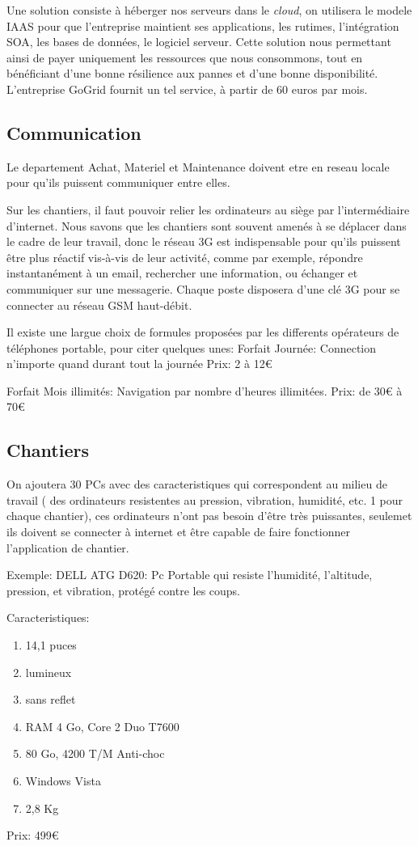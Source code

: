 \documentclass [a4paper] {report}
\begin{document}
Une solution consiste à héberger nos serveurs dans le \textsl{cloud}, on utilisera le modele IAAS pour  que l'entreprise maintient ses applications, les rutimes, l'intégration SOA, les bases de données, le logiciel serveur.
Cette solution nous permettant ainsi de payer uniquement les ressources que nous consommons, tout en bénéficiant d'une bonne résilience aux pannes et d'une bonne disponibilité.
L'entreprise GoGrid fournit un tel service, à partir de 60 euros par mois.


\subsection{Communication}
Le departement Achat, Materiel et Maintenance doivent etre en reseau locale pour qu'ils puissent  communiquer entre elles.

Sur les chantiers, il faut pouvoir relier les ordinateurs au siège par l’intermédiaire d’internet. Nous savons que les chantiers sont souvent amenés à se déplacer dans le cadre de leur travail, donc le réseau 3G est indispensable pour qu'ils puissent être plus réactif vis-à-vis de leur activité, comme par exemple, répondre instantanément à un email, rechercher une information, ou échanger et communiquer sur une messagerie. Chaque poste disposera d’une clé 3G pour se connecter au réseau GSM haut-débit.

Il existe une largue choix de formules proposées par les differents opérateurs de téléphones portable, pour citer quelques unes:
Forfait Journée: Connection n'importe quand durant tout la journée
Prix: 2 à 12€

Forfait Mois illimités: Navigation par nombre d'heures illimitées.
Prix: de 30€ à 70€


   

\subsection{Chantiers}
On ajoutera 30 PCs avec des caracteristiques qui correspondent au milieu de travail ( des ordinateurs resistentes au pression, vibration, humidité, etc. 1 pour chaque chantier), ces ordinateurs n'ont pas besoin d’être très puissantes, seulemet ils doivent se connecter à internet et être capable de faire fonctionner l’application de chantier.

Exemple:
DELL ATG D620: Pc Portable qui resiste l'humidité, l'altitude, pression, et vibration, protégé 
contre les coups.
	
	Caracteristiques:

	\begin{enumerate}
		\item 14,1 puces
		\item lumineux
		\item sans reflet
		\item RAM 4 Go, Core 2 Duo T7600
		\item 80 Go, 4200 T/M Anti-choc
		\item Windows Vista
		\item 2,8 Kg
	\end{enumerate}

Prix: 499€
\end{document}
